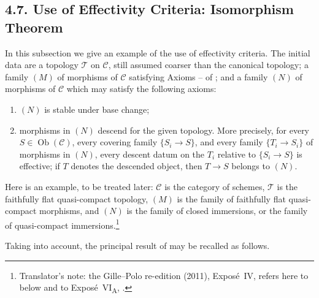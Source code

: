 

\subsection*{4.7. Use of Effectivity Criteria: Isomorphism Theorem}

In this subsection we give an example of the use of effectivity criteria.
The initial data are a topology \(\mathcal T\) on \(\mathscr C\), still
assumed coarser than the canonical topology; a family \((M)\) of morphisms
of \(\mathscr C\) satisfying Axioms -- of ;
and a family \((N)\) of morphisms of \(\mathscr C\) which may satisfy the
following axioms:
\begin{enumerate}
  \item[(a)] \((N)\) is stable under base change;
  \item[\((f_{\mathcal T})\)] morphisms in \((N)\) descend for the given
    topology. More precisely, for every
    \(S\in\operatorname{Ob}(\mathscr C)\), every covering family
    \(\{S_i\to S\}\), and every family \(\{T_i\to S_i\}\) of morphisms
    in \((N)\), every descent datum on the \(T_i\) relative to
    \(\{S_i\to S\}\) is effective; if \(T\) denotes the descended
    object, then \(T\to S\) belongs to \((N)\).
\end{enumerate}

Here is an example, to be treated later: \(\mathscr C\) is the category of
schemes, \(\mathcal T\) is the faithfully flat quasi-compact topology,
\((M)\) is the family of faithfully flat quasi-compact morphisms, and
\((N)\) is the family of closed immersions, or the family of quasi-compact
immersions.\footnote{Translator's note: the Gille--Polo re-edition (2011), Expos\'e~IV, refers
here to  below and to
Expos\'e~VI\textsubscript{A}, .}

Taking  into account, the principal result of  may be recalled
as follows.

